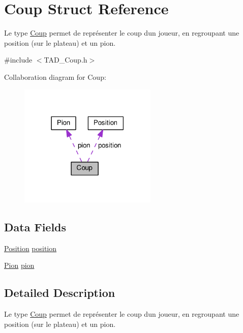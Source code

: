 \hypertarget{struct_coup}{}\section{Coup Struct Reference}
\label{struct_coup}


Le type \hyperlink{struct_coup}{Coup} permet de représenter le coup d\textquotesingle{}un joueur, en regroupant une position (sur le plateau) et un pion.  




{\ttfamily \#include $<$T\+A\+D\+\_\+\+Coup.\+h$>$}



Collaboration diagram for Coup\+:
\nopagebreak
\begin{figure}[H]
\begin{center}
\leavevmode
\includegraphics[width=186pt]{struct_coup__coll__graph}
\end{center}
\end{figure}
\subsection*{Data Fields}
\begin{DoxyCompactItemize}
\item 
\hyperlink{struct_position}{Position} \hyperlink{struct_coup_a4d84949a19a29d3bb4dd2635c8241a83}{position}
\item 
\hyperlink{struct_pion}{Pion} \hyperlink{struct_coup_ad71b3ad38e648f9979a7e37f3ac0c258}{pion}
\end{DoxyCompactItemize}


\subsection{Detailed Description}
Le type \hyperlink{struct_coup}{Coup} permet de représenter le coup d\textquotesingle{}un joueur, en regroupant une position (sur le plateau) et un pion. 

